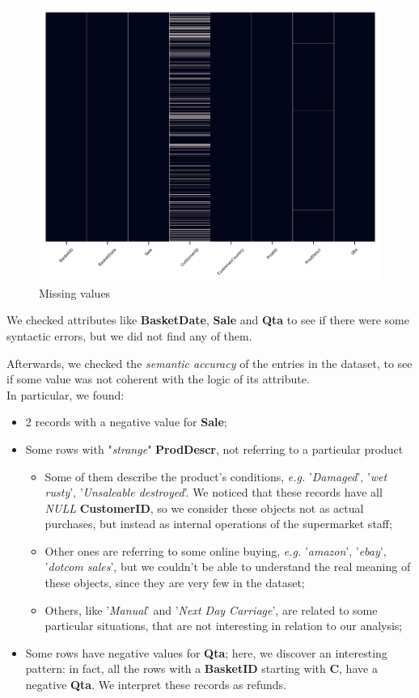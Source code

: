 \begin{figure}[h!]
\centering
\includegraphics[height=9cm, width=15cm]{img/missing_values.png}
\caption{Missing values}
\end{figure}

We checked attributes like \textbf{BasketDate}, \textbf{Sale} and \textbf{Qta} to see if there were some syntactic errors, but we did not find any of them.

Afterwards, we checked the \emph{semantic accuracy} of the entries in the dataset, to see if some value was not coherent with the logic of its attribute.\\
In particular, we found:
\begin{itemize}
\item 2 records with a negative value for \textbf{Sale};

\item Some rows with "\emph{strange}" \textbf{ProdDescr}, not referring to a particular product
	\begin{itemize}
		\item Some of them describe the product's conditions, \emph{e.g.} '\emph{Damaged}', '\emph{wet rusty}', '\emph{Unsaleable destroyed}'. We noticed that these records have all \emph{NULL} \textbf{CustomerID}, so we consider these objects not as actual purchases, but instead as internal operations of the supermarket staff;
		\item Other ones are referring to some online buying, \emph{e.g.} '\emph{amazon}', '\emph{ebay}', '\emph{dotcom sales}', but we couldn't be able to understand the real meaning of these objects, since they are very few in the dataset;
		\item Others, like '\emph{Manual}' and '\emph{Next Day Carriage}', are related to some particular situations, that are not interesting in relation to our analysis;
	\end{itemize}

\item Some rows have negative values for \textbf{Qta}; here, we discover an interesting pattern: in fact, all the rows with a \textbf{BasketID} starting with \textbf{C}, have a negative \textbf{Qta}. We interpret these records as refunds.
\end{itemize}

